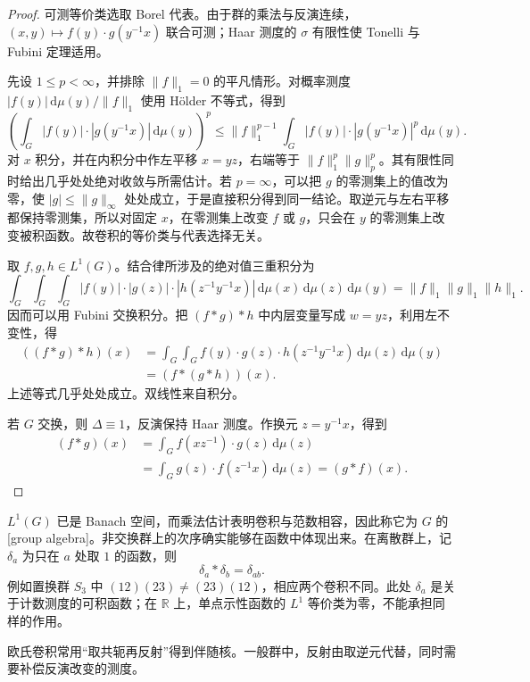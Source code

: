 \begin{proof}
可测等价类选取 Borel 代表。由于群的乘法与反演连续，\((x,y)\mapsto f(y)\cdot g(y^{-1}x)\) 联合可测；Haar 测度的 \(\sigma\) 有限性使 Tonelli 与 Fubini 定理适用。

先设 \(1\le p<\infty\)，并排除 \(\|f\|_1=0\) 的平凡情形。对概率测度 \(|f(y)|\,\mathrm d\mu(y)/\|f\|_1\) 使用 Hölder 不等式，得到
\[
 \left(\int_G|f(y)|\cdot|g(y^{-1}x)|\,\mathrm d\mu(y)\right)^p
 \le\|f\|_1^{p-1}
 \int_G|f(y)|\cdot|g(y^{-1}x)|^p\,\mathrm d\mu(y).
\]
对 \(x\) 积分，并在内积分中作左平移 \(x=yz\)，右端等于 \(\|f\|_1^p\|g\|_p^p\)。其有限性同时给出几乎处处绝对收敛与所需估计。若 \(p=\infty\)，可以把 \(g\) 的零测集上的值改为零，使 \(|g|\le\|g\|_\infty\) 处处成立，于是直接积分得到同一结论。取逆元与左右平移都保持零测集，所以对固定 \(x\)，在零测集上改变 \(f\) 或 \(g\)，只会在 \(y\) 的零测集上改变被积函数。故卷积的等价类与代表选择无关。

取 \(f,g,h\in L^1(G)\)。结合律所涉及的绝对值三重积分为
\[
 \int_G\!\int_G\!\int_G
 |f(y)|\cdot|g(z)|\cdot|h(z^{-1}y^{-1}x)|
 \,\mathrm d\mu(x)\,\mathrm d\mu(z)\,\mathrm d\mu(y)
 =\|f\|_1\|g\|_1\|h\|_1.
\]
因而可以用 Fubini 交换积分。把 \((f*g)*h\) 中内层变量写成 \(w=yz\)，利用左不变性，得
\[
 \begin{aligned}
 ((f*g)*h)(x)
 &=\int_G\!\int_G
 f(y)\cdot g(z)\cdot h(z^{-1}y^{-1}x)\,\mathrm d\mu(z)\,\mathrm d\mu(y)
 \\
 &=(f*(g*h))(x).
 \end{aligned}
\]
上述等式几乎处处成立。双线性来自积分。

若 \(G\) 交换，则 \(\Delta\equiv1\)，反演保持 Haar 测度。作换元 \(z=y^{-1}x\)，得到
\[
 \begin{aligned}
 (f*g)(x)&=\int_G f(xz^{-1})\cdot g(z)\,\mathrm d\mu(z)\\
 &=\int_G g(z)\cdot f(z^{-1}x)\,\mathrm d\mu(z)=(g*f)(x).
 \end{aligned}
\]
\end{proof}

\(L^1(G)\) 已是 Banach 空间，而乘法估计表明卷积与范数相容，因此称它为 \(G\) 的[group algebra]。非交换群上的次序确实能够在函数中体现出来。在离散群上，记 \(\delta_a\) 为只在 \(a\) 处取 \(1\) 的函数，则
\[
 \delta_a*\delta_b=\delta_{ab}.
\]
例如置换群 \(S_3\) 中 \((12)(23)\ne(23)(12)\)，相应两个卷积不同。此处 \(\delta_a\) 是关于计数测度的可积函数；在 \(\mathbb R\) 上，单点示性函数的 \(L^1\) 等价类为零，不能承担同样的作用。

欧氏卷积常用“取共轭再反射”得到伴随核。一般群中，反射由取逆元代替，同时需要补偿反演改变的测度。

